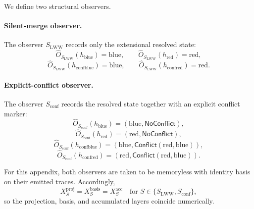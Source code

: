 \documentclass[11pt,twoside]{article}
\theoremstyle{definition}
\newcommand{\proj}{\mathrm{proj}}
\newcommand{\basis}{\mathrm{basis}}
\newcommand{\acc}{\mathrm{acc}}
\newcommand{\blue}{\mathrm{blue}}
\newcommand{\red}{\mathrm{red}}
\newcommand{\conf}{\mathrm{conf}}
\begin{document}
We define two structural observers.

\paragraph{Silent-merge observer.}
The observer \(S_{\mathrm{LWW}}\) records only the extensional resolved state:
\[
  \widehat{O}_{S_{\mathrm{LWW}}}(h_{\blue})=\blue,
  \qquad
  \widehat{O}_{S_{\mathrm{LWW}}}(h_{\red})=\red,
\]
\[
  \widehat{O}_{S_{\mathrm{LWW}}}(h_{\conf\blue})=\blue,
  \qquad
  \widehat{O}_{S_{\mathrm{LWW}}}(h_{\conf\red})=\red.
\]

\paragraph{Explicit-conflict observer.}
The observer \(S_{\mathrm{conf}}\) records the resolved state together with an explicit conflict marker:
\[
  \widehat{O}_{S_{\mathrm{conf}}}(h_{\blue})
  =
  (\blue,\mathsf{NoConflict}),
\]
\[
  \widehat{O}_{S_{\mathrm{conf}}}(h_{\red})
  =
  (\red,\mathsf{NoConflict}),
\]
\[
  \widehat{O}_{S_{\mathrm{conf}}}(h_{\conf\blue})
  =
  (\blue,\mathsf{Conflict}(\red,\blue)),
\]
\[
  \widehat{O}_{S_{\mathrm{conf}}}(h_{\conf\red})
  =
  (\red,\mathsf{Conflict}(\red,\blue)).
\]

For this appendix, both observers are taken to be memoryless with identity basis on their emitted traces. Accordingly,
\[
  X_S^{\proj} = X_S^{\basis} = X_S^{\acc}
  \quad\text{for } S\in\{S_{\mathrm{LWW}},S_{\mathrm{conf}}\},
\]
so the projection, basis, and accumulated layers coincide numerically.
\end{document}
